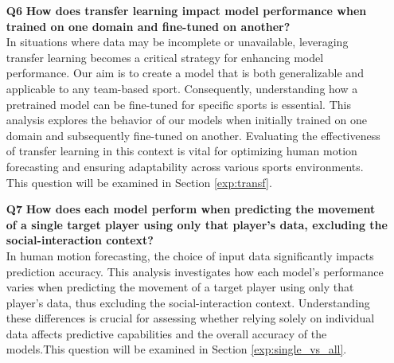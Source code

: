 \begin{itemize}
\item[\textbf{Q6}] \textbf{How does transfer learning impact model performance when trained on one domain and fine-tuned on another?} \\
In situations where data may be incomplete or unavailable, leveraging transfer learning becomes a critical strategy for enhancing model performance. Our aim is to create a model that is both generalizable and applicable to any team-based sport. Consequently, understanding how a pretrained model can be fine-tuned for specific sports is essential. This analysis explores the behavior of our models when initially trained on one domain and subsequently fine-tuned on another. Evaluating the effectiveness of transfer learning in this context is vital for optimizing human motion forecasting and ensuring adaptability across various sports environments. This question will be examined in Section \ref{exp:transf}.


\item[\textbf{Q7}] \textbf{How does each model perform when predicting the movement of a single target player using only that player's data, excluding the social-interaction context?} \\
In human motion forecasting, the choice of input data significantly impacts prediction accuracy. This analysis investigates how each model's performance varies when predicting the movement of a target player using only that player's data, thus excluding the social-interaction context. Understanding these differences is crucial for assessing whether relying solely on individual data affects predictive capabilities and the overall accuracy of the models.This question will be examined in Section \ref{exp:single_vs_all}.

\end{itemize}
